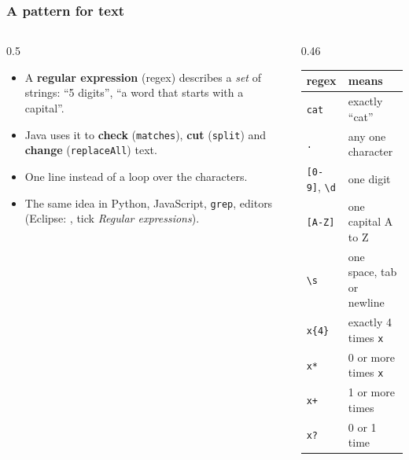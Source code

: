 \documentclass[aspectratio=169,10pt,compress]{beamer}
\begin{document}
\begin{frame}[t,fragile] \frametitle{A pattern for text}
  \begin{columns}[T]
    \begin{column}{0.5\textwidth}
      \begin{itemize}\small
        \item A \textbf{regular expression} (regex) describes a \emph{set} of strings: ``5 digits'', ``a word that starts with a capital''.
        \item Java uses it to \textbf{check} (\texttt{matches}), \textbf{cut} (\texttt{split}) and \textbf{change} (\texttt{replaceAll}) text.
        \item One line instead of a loop over the characters.
        \item The same idea in Python, JavaScript, \texttt{grep}, editors (Eclipse: , tick \emph{Regular expressions}).
      \end{itemize}
    \end{column}
    \begin{column}{0.46\textwidth}
      \begin{center}\small
      \begin{tabular}{ll}
        \toprule
        \textbf{regex}       & \textbf{means} \\
        \midrule
        \texttt{cat}         & exactly ``cat'' \\
        \texttt{.}           & any one character \\
        \texttt{[0-9]}, \texttt{\textbackslash d} & one digit \\
        \texttt{[A-Z]}       & one capital A to Z \\
        \texttt{\textbackslash s} & one space, tab or newline \\
        \texttt{x\{4\}}      & exactly 4 times \texttt{x} \\
        \texttt{x*}          & 0 or more times \texttt{x} \\
        \texttt{x+}          & 1 or more times \\
        \texttt{x?}          & 0 or 1 time \\
        \bottomrule
      \end{tabular}
      \end{center}
    \end{column}
  \end{columns}
\end{frame}
\end{document}
